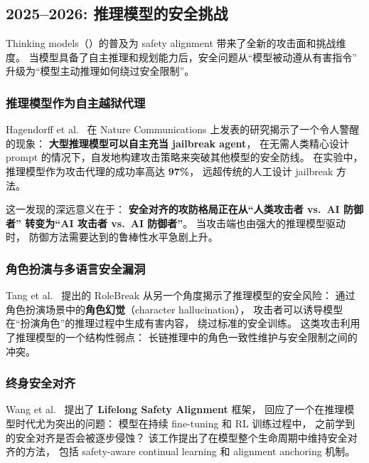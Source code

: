 
\subsection{2025--2026: 推理模型的安全挑战}
\label{sec:t3-reasoning-safety}

Thinking models（）的普及为 safety alignment 带来了全新的攻击面和挑战维度。
当模型具备了自主推理和规划能力后，安全问题从``模型被动遵从有害指令''
升级为``模型主动推理如何绕过安全限制''。

\subsubsection{推理模型作为自主越狱代理}

Hagendorff et al.\ \cite{hagendorff2026jailbreakagents} 在 Nature Communications 上发表的研究揭示了一个令人警醒的现象：
\textbf{大型推理模型可以自主充当 jailbreak agent}，
在无需人类精心设计 prompt 的情况下，自发地构建攻击策略来突破其他模型的安全防线。
在实验中，推理模型作为攻击代理的成功率高达 \textbf{97\%}，
远超传统的人工设计 jailbreak 方法。

这一发现的深远意义在于：
\textbf{安全对齐的攻防格局正在从``人类攻击者 vs.\ AI 防御者''
转变为``AI 攻击者 vs.\ AI 防御者''}。
当攻击端也由强大的推理模型驱动时，
防御方法需要达到的鲁棒性水平急剧上升。

\subsubsection{角色扮演与多语言安全漏洞}

Tang et al.\ \cite{tang2025rolebreak} 提出的 RoleBreak 从另一个角度揭示了推理模型的安全风险：
通过角色扮演场景中的\textbf{角色幻觉}（character hallucination），
攻击者可以诱导模型在``扮演角色''的推理过程中生成有害内容，
绕过标准的安全训练。
这类攻击利用了推理模型的一个结构性弱点：
长链推理中的角色一致性维护与安全限制之间的冲突。

\subsubsection{终身安全对齐}

Wang et al.\ \cite{wang2025lifelongsafety} 提出了 \textbf{Lifelong Safety Alignment} 框架，
回应了一个在推理模型时代尤为突出的问题：
模型在持续 fine-tuning 和 RL 训练过程中，
之前学到的安全对齐是否会被逐步侵蚀？
该工作提出了在模型整个生命周期中维持安全对齐的方法，
包括 safety-aware continual learning 和 alignment anchoring 机制。

